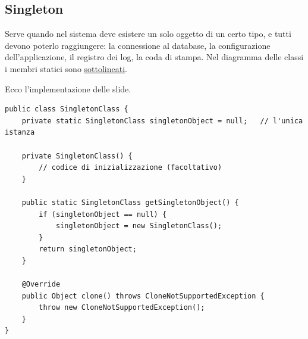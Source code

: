 \subsection{Singleton}


Serve quando nel sistema deve esistere un solo oggetto di un certo tipo, e tutti devono poterlo raggiungere: la
connessione al database, la configurazione dell'applicazione, il registro dei log, la coda di stampa. Nel diagramma delle
classi i membri statici sono \underline{sottolineati}.

\begin{center}
\end{center}

Ecco l'implementazione delle slide.

\begin{lstlisting}[style=java, name=SingletonClass.java]
public class SingletonClass {
    private static SingletonClass singletonObject = null;   // l'unica istanza

    private SingletonClass() {
        // codice di inizializzazione (facoltativo)
    }

    public static SingletonClass getSingletonObject() {
        if (singletonObject == null) {
            singletonObject = new SingletonClass();
        }
        return singletonObject;
    }

    @Override
    public Object clone() throws CloneNotSupportedException {
        throw new CloneNotSupportedException();
    }
}
\end{lstlisting}

